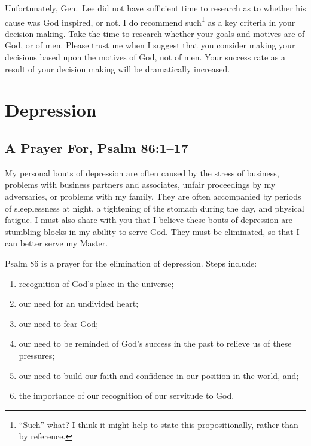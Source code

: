 \documentclass[12pt]{memoir}
\begin{document}
Unfortunately, Gen.~Lee did not have sufficient time to research as
to whether his cause was God inspired, or not. I do recommend such\footnote{``Such'' what? I think it might help to state this propositionally, rather than by reference.}
as a key criteria in your decision-making. Take the time to research
whether your goals and motives are of God, or of men. Please
trust me when I suggest that you consider making your decisions based
upon the motives of God, not of men. Your success rate as a result
of your decision making will be dramatically increased.

\section{Depression}

\subsection[A Prayer For]{A Prayer For, Psalm 86:1--17}

My personal bouts of depression are often caused by the stress of
business, problems with business partners and associates, unfair proceedings
by my adversaries, or problems with my family. They are often accompanied
by periods of sleeplessness at night, a tightening of the stomach
during the day, and physical fatigue. I must also share with you that
I believe these bouts of depression are stumbling blocks in my ability
to serve God. They must be eliminated, so that I can better serve
my Master.

Psalm 86 is a prayer for the elimination of depression. Steps include: 

\begin{enumerate}
\item recognition of God's place in the universe; 

\item our need for an undivided heart;

\item our need to fear God;

\item our need to be reminded of God's success in the past to relieve us of these pressures;

\item our need to build our faith and confidence in our position in the world, and;

\item the importance of our recognition of our servitude to God. 
\end{enumerate}
\end{document}
